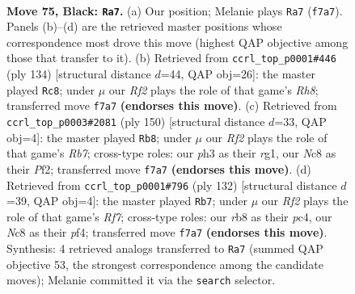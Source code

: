 \documentclass[11pt]{article}
\begin{document}
\clearpage

\begin{figure}[p]\centering
\begin{subfigure}{0.46\textwidth}\centering
\resizebox{\linewidth}{!}{%
\newchessgame
\chessboard[
  setfen={1Rnk4/5r2/P7/2P4p/8/2pB2PP/2P1K3/8 b - - 0 75},
  showmover=false,
  pgfstyle=straightmove, color=movearrow, markmove={f7-a7}
]}
\caption{}
\end{subfigure}\hfill
\begin{subfigure}{0.46\textwidth}\centering
\resizebox{\linewidth}{!}{%
\newchessgame
\chessboard[
  setfen={7R/8/3P4/4p1k1/2p1Pp1b/5P1P/8/3r1NK1 w - - 4 68},
  showmover=false,
  pgfstyle=straightmove, color=movearrow, markmove={h8-c8}
]}
\caption{}
\end{subfigure}
\\[4pt]
\begin{subfigure}{0.46\textwidth}\centering
\resizebox{\linewidth}{!}{%
\newchessgame
\chessboard[
  setfen={8/1R6/3p1k2/3Pb3/5p2/3B3K/1p3P2/6r1 w - - 8 76},
  showmover=false,
  pgfstyle=straightmove, color=movearrow, markmove={b7-b8}
]}
\caption{}
\end{subfigure}\hfill
\begin{subfigure}{0.46\textwidth}\centering
\resizebox{\linewidth}{!}{%
\newchessgame
\chessboard[
  setfen={8/5R2/4p1p1/4k3/2pb1p1P/5P2/1pK3P1/8 w - - 0 67},
  showmover=false,
  pgfstyle=straightmove, color=movearrow, markmove={f7-b7}
]}
\caption{}
\end{subfigure}
\caption{\textbf{Move 75, Black: \texttt{Ra7}.} (a) Our position; Melanie plays \texttt{Ra7} (\texttt{f7a7}). Panels (b)--(d) are the retrieved master positions whose correspondence most drove this move (highest QAP objective among those that transfer to it). (b) Retrieved from \texttt{ccrl\_top\_p0001\#446} (ply 134) [structural distance $d$=44, QAP obj=26]: the master played \texttt{Rc8}; under $\mu$ our \emph{Rf2} plays the role of that game's \emph{Rh8}; transferred move \texttt{f7a7} \textbf{(endorses this move)}. (c) Retrieved from \texttt{ccrl\_top\_p0003\#2081} (ply 150) [structural distance $d$=33, QAP obj=4]: the master played \texttt{Rb8}; under $\mu$ our \emph{Rf2} plays the role of that game's \emph{Rb7}; cross-type roles: our \emph{p}h3 as their \emph{r}g1, our \emph{N}c8 as their \emph{P}f2; transferred move \texttt{f7a7} \textbf{(endorses this move)}. (d) Retrieved from \texttt{ccrl\_top\_p0001\#796} (ply 132) [structural distance $d$=39, QAP obj=4]: the master played \texttt{Rb7}; under $\mu$ our \emph{Rf2} plays the role of that game's \emph{Rf7}; cross-type roles: our \emph{r}b8 as their \emph{p}c4, our \emph{N}c8 as their \emph{p}f4; transferred move \texttt{f7a7} \textbf{(endorses this move)}. Synthesis: 4 retrieved analogs transferred to \texttt{Ra7} (summed QAP objective 53, the strongest correspondence among the candidate moves); Melanie committed it via the \texttt{search} selector.}
\label{fig:thought-m149}
\end{figure}
\end{document}
